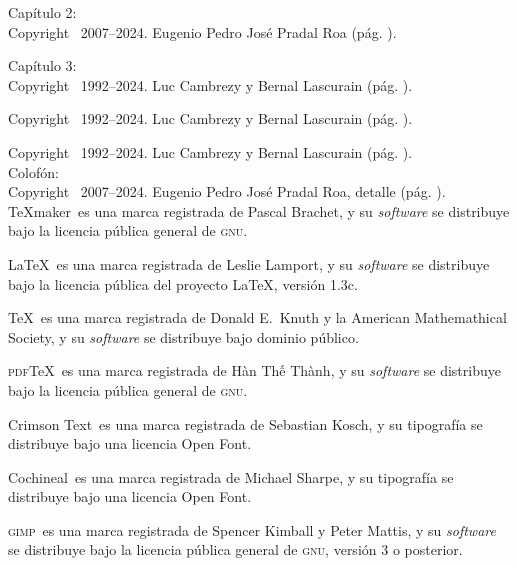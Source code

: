 \documentclass[14pt,twoside,final]{extbook} %
\begin{document}
\noindent Capítulo 2: \\

\noindent Copyright \textcopyright\ 2007--2024. Eugenio Pedro José Pradal Roa (pág. \pageref{fig:jalacingo-photo}).

\noindent Capítulo 3: \\

\noindent Copyright \textcopyright\ 1992--2024. Luc Cambrezy y Bernal Lascurain (pág. \pageref{fig:hda-limon}).

\noindent Copyright \textcopyright\ 1992--2024. Luc Cambrezy y Bernal Lascurain (pág. \pageref{fig:hda-cuatotolapam}).

\noindent Copyright \textcopyright\ 1992--2024. Luc Cambrezy y Bernal Lascurain (pág. \pageref{fig:hda-tenextepec}). \\

\noindent Colofón: \\

\noindent Copyright \textcopyright\ 2007--2024. Eugenio Pedro José Pradal Roa, detalle (pág. \pageref{fig:vineta}). \\

\noindent TeXmaker\texttrademark\ es una marca registrada de Pascal Brachet, y su \emph{software} se distribuye bajo la licencia pública general de \textsc{gnu}.

LaTeX\texttrademark\ es una marca registrada de Leslie Lamport, y su \emph{software} se distribuye bajo la licencia pública del proyecto LaTeX, versión 1.3c.

TeX\texttrademark\ es una marca registrada de Donald E.~Knuth y la American Math\-emathical Society, y su \emph{software} se distribuye bajo dominio público.

\textsc{pdf}TeX\texttrademark\ es una marca registrada de H\`{a}n Th\'{\^{e}} Th\`{a}nh, y su \emph{software} se distribuye bajo la licencia pública general de \textsc{gnu}.

Crimson Text\texttrademark\ es una marca registrada de Sebastian Kosch, y su tipografía se distribuye bajo una licencia  Open Font.

Cochineal\texttrademark\ es una marca registrada de Michael Sharpe, y su tipografía se distribuye bajo una licencia  Open Font.

\textsc{gimp}\texttrademark\ es una marca registrada de Spencer Kimball y Peter Mattis, y su \emph{software} se distribuye bajo la licencia pública general de \textsc{gnu}, versión 3 o posterior.
\end{document}
